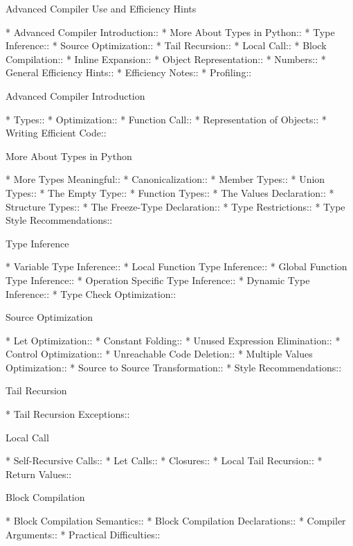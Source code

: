 \begin{menu}
Advanced Compiler Use and Efficiency Hints

* Advanced Compiler Introduction::  
* More About Types in Python::  
* Type Inference::              
* Source Optimization::         
* Tail Recursion::              
* Local Call::                  
* Block Compilation::           
* Inline Expansion::            
* Object Representation::       
* Numbers::                     
* General Efficiency Hints::    
* Efficiency Notes::            
* Profiling::                   

Advanced Compiler Introduction

* Types::                       
* Optimization::                
* Function Call::               
* Representation of Objects::   
* Writing Efficient Code::      

More About Types in Python

* More Types Meaningful::       
* Canonicalization::            
* Member Types::                
* Union Types::                 
* The Empty Type::              
* Function Types::              
* The Values Declaration::      
* Structure Types::             
* The Freeze-Type Declaration::  
* Type Restrictions::           
* Type Style Recommendations::  

Type Inference

* Variable Type Inference::     
* Local Function Type Inference::  
* Global Function Type Inference::  
* Operation Specific Type Inference::  
* Dynamic Type Inference::      
* Type Check Optimization::     

Source Optimization

* Let Optimization::            
* Constant Folding::            
* Unused Expression Elimination::  
* Control Optimization::        
* Unreachable Code Deletion::   
* Multiple Values Optimization::  
* Source to Source Transformation::  
* Style Recommendations::       

Tail Recursion

* Tail Recursion Exceptions::   

Local Call

* Self-Recursive Calls::        
* Let Calls::                   
* Closures::                    
* Local Tail Recursion::        
* Return Values::               

Block Compilation

* Block Compilation Semantics::  
* Block Compilation Declarations::  
* Compiler Arguments::          
* Practical Difficulties::      


\end{menu}
